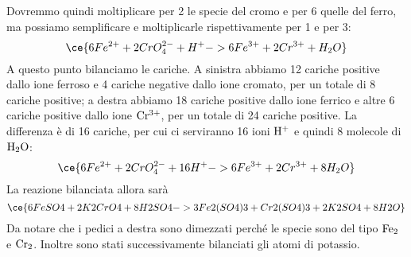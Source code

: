 \begin{soluzione}
\begin{equation*}
    \end{equation*}
    Dovremmo quindi moltiplicare per 2 le specie del cromo e per 6 quelle del ferro, ma possiamo semplificare e moltiplicarle rispettivamente per 1 e per 3:
    \begin{equation*}
        \ce{6Fe^{2+} + 2CrO_4^{2-} + H^+ -> 6Fe^{3+} + 2Cr^{3+} + H_2O}
    \end{equation*}
    A questo punto bilanciamo le cariche. A sinistra abbiamo 12 cariche positive dallo ione ferroso e 4 cariche negative dallo ione cromato, per un totale di 8 cariche positive; a destra abbiamo 18 cariche positive dallo ione ferrico e altre 6 cariche positive dallo ione $\rm Cr^{3+}$, per un totale di 24 cariche positive. La differenza è di 16 cariche, per cui ci serviranno 16 ioni $\rm H^+$ e quindi 8 molecole di $\rm H_2O$:
    \begin{equation*}
        \ce{6Fe^{2+} + 2CrO_4^{2-} + 16H^+ -> 6Fe^{3+} + 2Cr^{3+} + 8H_2O}
    \end{equation*}
    La reazione bilanciata allora sarà
    \begin{equation*}
        \ce{6FeSO4 + 2K2CrO4 + 8H2SO4 -> 3Fe2(SO4)3 + Cr2(SO4)3 + 2K2SO4 + 8H2O}
    \end{equation*}
    Da notare che i pedici a destra sono dimezzati perché le specie sono del tipo $\rm Fe_2$ e $\rm Cr_2$. Inoltre sono stati successivamente bilanciati gli atomi di potassio.
\end{soluzione}

\newpage

